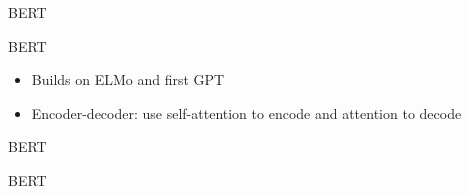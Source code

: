 \documentclass[t,aspectratio=169]{beamer}
\begin{document}
\begin{frame}{BERT}
\end{frame}

\begin{frame}{BERT}
  \begin{itemize}
  \item Builds on ELMo and first GPT
  \item Encoder-decoder: use self-attention to encode and attention to decode
  \end{itemize}


\end{frame}

\begin{frame}{BERT}
\end{frame}

\begin{frame}{BERT}
\end{frame}

\begin{frame}{}
\end{frame}

\begin{frame}{}
\end{frame}

\begin{frame}{}
\end{frame}

\begin{frame}{}
\end{frame}

\begin{frame}{}
\end{frame}

\begin{frame}{}
\end{frame}

\begin{frame}{}
\end{frame}

\begin{frame}{}
\end{frame}

\begin{frame}{}
\end{frame}


\begin{frame}
\end{frame}
\end{document}
